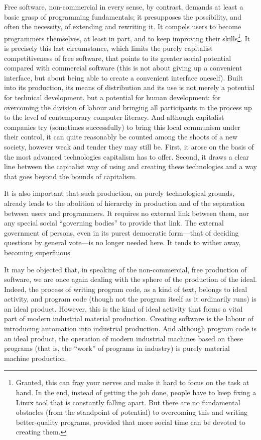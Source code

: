 \documentclass[../main]{subfiles}
\begin{document}
Free software, non-commercial in every sense, by contrast, demands at least a basic grasp of programming fundamentals; it presupposes the possibility, and often the necessity, of extending and rewriting it. It compels users to become programmers themselves, at least in part, and to keep improving their skills\footnote{Granted, this can fray your nerves and make it hard to focus on the task at hand. In the end, instead of getting the job done, people have to keep fixing a Linux tool that is constantly falling apart. But there are no fundamental obstacles (from the standpoint of potential) to overcoming this and writing better-quality programs, provided that more social time can be devoted to creating them.}. It is precisely this last circumstance, which limits the purely capitalist competitiveness of free software, that points to its greater social potential compared with commercial software (this is not about giving up a convenient interface, but about being able to create a convenient interface oneself). Built into its production, its means of distribution and its use is not merely a potential for technical development, but a potential for human development: for overcoming the division of labour and bringing all participants in the process up to the level of contemporary computer literacy. And although capitalist companies try (sometimes successfully) to bring this local communism under their control, it can quite reasonably be counted among the shoots of a new society, however weak and tender they may still be. First, it arose on the basis of the most advanced technologies capitalism has to offer. Second, it draws a clear line between the capitalist way of using and creating these technologies and a way that goes beyond the bounds of capitalism.

It is also important that such production, on purely technological grounds, already leads to the abolition of hierarchy in production and of the separation between users and programmers. It requires no external link between them, nor any special social “governing bodies” to provide that link. The external government of persons, even in its purest democratic form—that of deciding questions by general vote—is no longer needed here. It tends to wither away, becoming superfluous.

It may be objected that, in speaking of the non-commercial, free production of software, we are once again dealing with the sphere of the production of the ideal. Indeed, the process of writing program code, as a kind of text, belongs to ideal activity, and program code (though not the program itself as it ordinarily runs) is an ideal product. However, this is the kind of ideal activity that forms a vital part of modern industrial material production. Creating software is the labour of introducing automation into industrial production. And although program code is an ideal product, the operation of modern industrial machines based on these programs (that is, the “work” of programs in industry) is purely material machine production.
\end{document}
